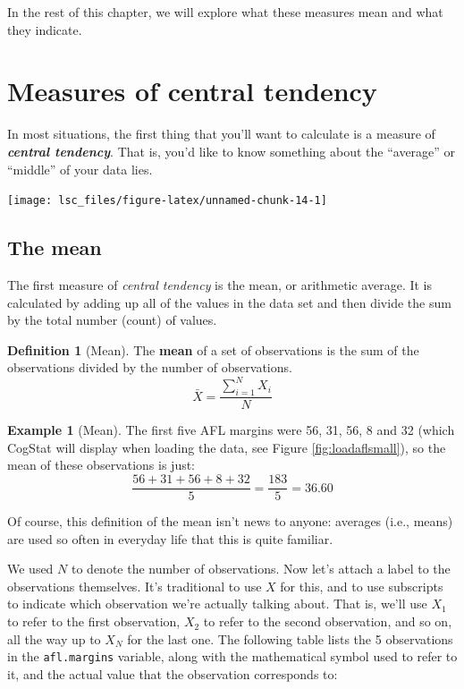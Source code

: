 \documentclass[
  11pt,
]{book}
\theoremstyle{definition}
\newtheorem{definition}{Definition}[chapter]
\theoremstyle{definition}
\newtheorem{example}{Example}[chapter]
\theoremstyle{definition}
\theoremstyle{definition}
\theoremstyle{remark}
\begin{document}
In the rest of this chapter, we will explore what these measures mean and what they indicate.

\hypertarget{centraltendency}{%
\section{Measures of central tendency}\label{centraltendency}}

In most situations, the first thing that you'll want to calculate is a measure of \textbf{\emph{central tendency}}. That is, you'd like to know something about the ``average'' or ``middle'' of your data lies.

\begin{center}\texttt{[image: lsc\_files/figure-latex/unnamed-chunk-14-1]} \end{center}

\hypertarget{mean}{%
\subsection{The mean}\label{mean}}

The first measure of \emph{central tendency} is the mean, or arithmetic average. It is calculated by adding up all of the values in the data set and then divide the sum by the total number (count) of values.

\begin{definition}[Mean]
\protect\hypertarget{def:defmean}{}\label{def:defmean}The \textbf{mean} of a set of observations is the sum of the observations divided by the number of observations.
\[
\bar{X} = \frac{\sum_{i=1}^N X_i}{N}
\]
\end{definition}

\begin{example}[Mean]
\protect\hypertarget{exm:exmean}{}\label{exm:exmean}The first five AFL margins were 56, 31, 56, 8 and 32 (which CogStat will display when loading the data, see Figure \ref{fig:loadaflsmall}), so the mean of these observations is just:
\[
\frac{56 + 31 + 56 + 8 + 32}{5} = \frac{183}{5} = 36.60
\]
\end{example}

Of course, this definition of the mean isn't news to anyone: averages (i.e., means) are used so often in everyday life that this is quite familiar.

We used \(N\) to denote the number of observations. Now let's attach a label to the observations themselves. It's traditional to use \(X\) for this, and to use subscripts to indicate which observation we're actually talking about. That is, we'll use \(X_1\) to refer to the first observation, \(X_2\) to refer to the second observation, and so on, all the way up to \(X_N\) for the last one. The following table lists the 5 observations in the \texttt{afl.margins} variable, along with the mathematical symbol used to refer to it, and the actual value that the observation corresponds to:
\end{document}
